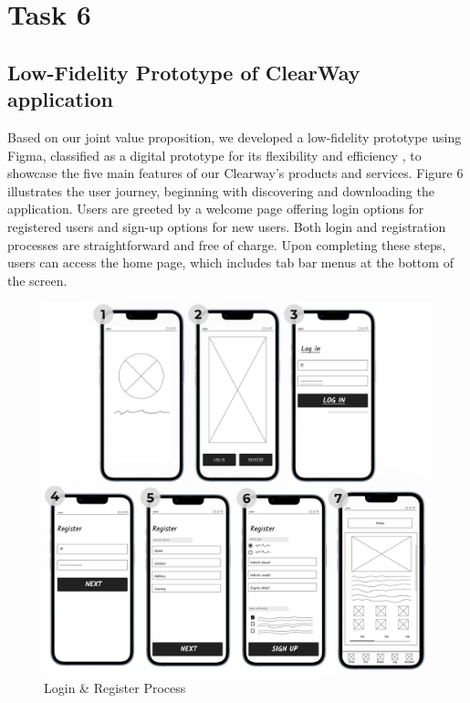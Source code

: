 \documentclass[12pt,a4paper]{article}
\begin{document}
\pagebreak


\setcounter{page}{11}
\label{sec:Question 6}
\section{Task 6}

\subsection{Low-Fidelity Prototype of ClearWay application}
\noindent Based on our joint value proposition, we developed a low-fidelity prototype using Figma, classified as a digital prototype for its flexibility and efficiency \citep{question_6.1}, to showcase the five main features of our Clearway's products and services. Figure 6 illustrates the user journey, beginning with discovering and downloading the application. Users are greeted by a welcome page offering login options for registered users and sign-up options for new users. Both login and registration processes are straightforward and free of charge. Upon completing these steps, users can access the home page, which includes tab bar menus at the bottom of the screen.\\
\begin{figure}[h]
    \centering
    \includegraphics[width=0.8
    \textwidth]{images/Prototype Figures/Prototype Figure 1.png}
    \caption{Login \& Register Process}
    \label{fig:example}
\end{figure}
\end{document}

